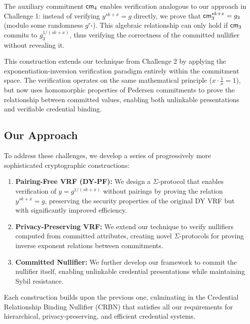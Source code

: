 The auxiliary commitment $\mathsf{cm}_4$ enables verification analogous to our approach in Challenge 1: instead of verifying $y^{sk+x} = g$ directly, we prove that $\mathsf{cm}_3^{sk+x} = g_3$ (modulo some randomness $g^{r_4}$). This algebraic relationship can only hold if $\mathsf{cm}_3$ commits to $g_3^{1/(sk+x)}$, thus verifying the correctness of the committed nullifier without revealing it.

This construction extends our technique from Challenge 2 by applying the exponentiation-inversion verification paradigm entirely within the commitment space. The verification operates on the same mathematical principle ($x \cdot \frac{1}{x} = 1$), but now uses homomorphic properties of Pedersen commitments to prove the relationship between committed values, enabling both unlinkable presentations and verifiable credential binding.




\subsection{Our Approach}

To address these challenges, we develop a series of progressively more sophisticated cryptographic constructions:

\begin{enumerate}
    \item \textbf{Pairing-Free VRF (DY-PF):} We design a $\Sigma$-protocol that enables verification of $y = g^{1/(sk+x)}$ without pairings by proving the relation $y^{sk+x} = g$, preserving the security properties of the original DY VRF but with significantly improved efficiency.
    
    \item \textbf{Privacy-Preserving VRF:} We extend our technique to verify nullifiers computed from committed attributes, creating novel $\Sigma$-protocols for proving inverse exponent relations between commitments.
    
    \item \textbf{Committed Nullifier:} We further develop our framework to commit the nullifier itself, enabling unlinkable credential presentations while maintaining Sybil resistance.
\end{enumerate}

Each construction builds upon the previous one, culminating in the Credential Relationship Binding Nullifier (CRBN) that satisfies all our requirements for hierarchical, privacy-preserving, and efficient credential systems.






